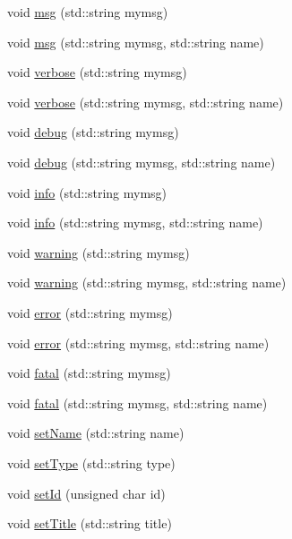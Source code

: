 \begin{DoxyCompactItemize}
\item 
void \hyperlink{classObject_a58b2d0618c2d08cf2383012611528d97}{msg} (std::string mymsg)
\item 
void \hyperlink{classObject_ac5d59299273cee27aacf7de00d2e7034}{msg} (std::string mymsg, std::string name)
\item 
void \hyperlink{classObject_a83d2db2df682907ea1115ad721c1c4a1}{verbose} (std::string mymsg)
\item 
void \hyperlink{classObject_a2d4120195317e2a3c6532e8bb9f3da68}{verbose} (std::string mymsg, std::string name)
\item 
void \hyperlink{classObject_aac010553f022165573714b7014a15f0d}{debug} (std::string mymsg)
\item 
void \hyperlink{classObject_a6c9a0397ca804e04d675ed05683f5420}{debug} (std::string mymsg, std::string name)
\item 
void \hyperlink{classObject_a644fd329ea4cb85f54fa6846484b84a8}{info} (std::string mymsg)
\item 
void \hyperlink{classObject_a1ca123253dfd30fc28b156f521dcbdae}{info} (std::string mymsg, std::string name)
\item 
void \hyperlink{classObject_a65cd4fda577711660821fd2cd5a3b4c9}{warning} (std::string mymsg)
\item 
void \hyperlink{classObject_a11f101db4dd73d9391b0231818881d86}{warning} (std::string mymsg, std::string name)
\item 
void \hyperlink{classObject_a204a95f57818c0f811933917a30eff45}{error} (std::string mymsg)
\item 
void \hyperlink{classObject_ad7f6c457733082efa2f9ff5f5c8e119a}{error} (std::string mymsg, std::string name)
\item 
void \hyperlink{classObject_aad5a16aac7516ce65bd5ec02ab07fc80}{fatal} (std::string mymsg)
\item 
void \hyperlink{classObject_ae62acd3d09f716220f75f252dc38bc9a}{fatal} (std::string mymsg, std::string name)
\item 
void \hyperlink{classObject_ae30fea75683c2d149b6b6d17c09ecd0c}{setName} (std::string name)
\item 
void \hyperlink{classObject_aae534cc9d982bcb9b99fd505f2e103a5}{setType} (std::string type)
\item 
void \hyperlink{classObject_a398fe08cba594a0ce6891d59fe4f159f}{setId} (unsigned char id)
\item 
void \hyperlink{classObject_a89557dbbad5bcaa02652f5d7fa35d20f}{setTitle} (std::string title)
\item 

\end{DoxyCompactItemize}
